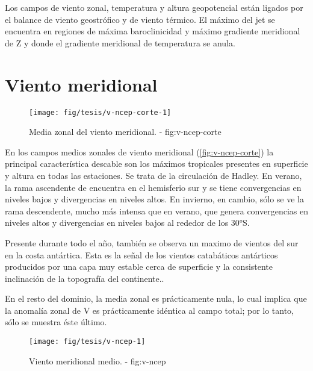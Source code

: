 \documentclass[spanish,a4paper]{book}
\begin{document}
Los campos de viento zonal, temperatura y altura geopotencial están
ligados por el balance de viento geostrófico y de viento térmico. El
máximo del jet se encuentra en regiones de máxima baroclinicidad y
máximo gradiente meridional de Z y donde el gradiente meridional de
temperatura se anula.

\section{Viento meridional}\label{viento-meridional}

\begin{figure}

{\centering \texttt{[image: fig/tesis/v-ncep-corte-1]} 

}

\caption{Media zonal del viento meridional. - fig:v-ncep-corte}\label{fig:v-ncep-corte}
\end{figure}

En los campos medios zonales de viento meridional
(\autoref{fig:v-ncep-corte}) la principal característica descable son
los máximos tropicales presentes en superficie y altura en todas las
estaciones. Se trata de la circulación de Hadley. En verano, la rama
ascendente de encuentra en el hemisferio sur y se tiene convergencias en
niveles bajos y divergencias en niveles altos. En invierno, en cambio,
sólo se ve la rama descendente, mucho más intensa que en verano, que
genera convergencias en niveles altos y divergencias en niveles bajos al
rededor de los 30°S.

Presente durante todo el año, también se observa un maximo de vientos
del sur en la costa antártica. Esta es la señal de los vientos
catabáticos antárticos producidos por una capa muy estable cerca de
superficie y la consistente inclinación de la topografía del
continente..

En el resto del dominio, la media zonal es prácticamente nula, lo cual
implica que la anomalía zonal de V es prácticamente idéntica al campo
total; por lo tanto, sólo se muestra éste último.

\begin{figure}

{\centering \texttt{[image: fig/tesis/v-ncep-1]} 

}

\caption{Viento meridional medio. - fig:v-ncep}\label{fig:v-ncep}
\end{figure}
\end{document}
